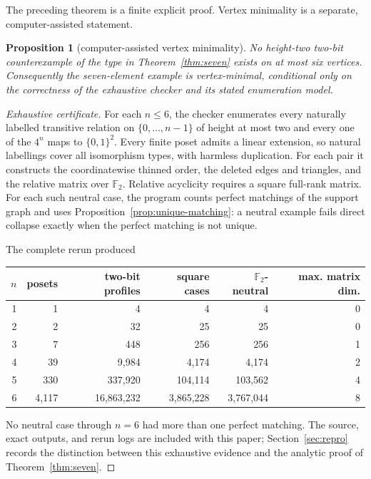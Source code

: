 \documentclass[11pt]{article}
\newtheorem{proposition}[theorem]{Proposition}
\theoremstyle{definition}
\theoremstyle{remark}
\newcommand{\Ftwo}{\mathbb F_2}
\begin{document}
The preceding theorem is a finite explicit proof.  Vertex minimality is a separate,
computer-assisted statement.

\begin{proposition}[computer-assisted vertex minimality]\label{prop:minimality}
No height-two two-bit counterexample of the type in Theorem~\ref{thm:seven} exists on
at most six vertices.  Consequently the seven-element example is vertex-minimal,
conditional only on the correctness of the exhaustive checker and its stated
enumeration model.
\end{proposition}

\begin{proof}[Exhaustive certificate]
For each $n\le6$, the checker enumerates every naturally labelled transitive relation
on $\{0,\ldots,n-1\}$ of height at most two and every one of the $4^n$ maps to
$\{0,1\}^2$.  Every finite poset admits a linear extension, so natural labellings cover
all isomorphism types, with harmless duplication.  For each pair it constructs the
coordinatewise thinned order, the deleted edges and triangles, and the relative
matrix over $\Ftwo$.  Relative acyclicity requires a square full-rank matrix.  For each
such neutral case, the program counts perfect matchings of the support graph and uses
Proposition~\ref{prop:unique-matching}: a neutral example fails direct collapse exactly
when the perfect matching is not unique.

The complete rerun produced
\begin{center}
\small
\begin{tabular}{@{}rrrrrr@{}}
\toprule
$n$ & posets & two-bit profiles & square cases & $\Ftwo$-neutral & max. matrix dim. \\
\midrule
1&1&4&4&4&0\\
2&2&32&25&25&0\\
3&7&448&256&256&1\\
4&39&9,984&4,174&4,174&2\\
5&330&337,920&104,114&103,562&4\\
6&4,117&16,863,232&3,865,228&3,767,044&8\\
\bottomrule
\end{tabular}
\end{center}
No neutral case through $n=6$ had more than one perfect matching.  The source, exact
outputs, and rerun logs are included with this paper; Section~\ref{sec:repro} records
the distinction between this exhaustive evidence and the analytic proof of
Theorem~\ref{thm:seven}.
\end{proof}
\end{document}
